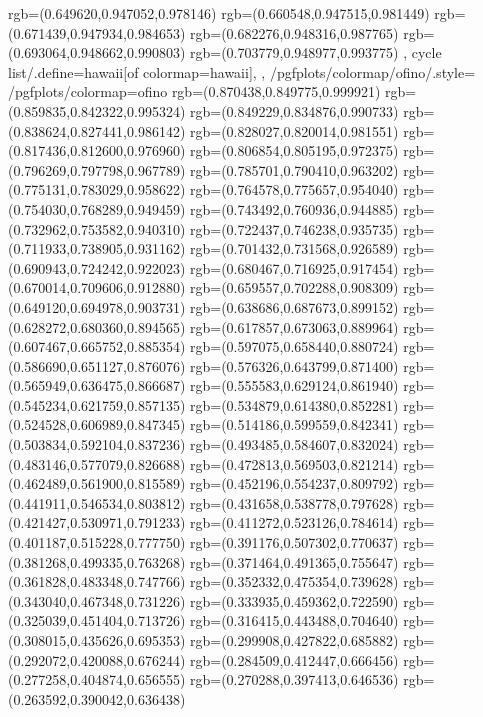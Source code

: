 {{{			rgb=(0.649620,0.947052,0.978146)
			rgb=(0.660548,0.947515,0.981449)
			rgb=(0.671439,0.947934,0.984653)
			rgb=(0.682276,0.948316,0.987765)
			rgb=(0.693064,0.948662,0.990803)
			rgb=(0.703779,0.948977,0.993775)
		},
	cycle list/.define={hawaii}{[of colormap=hawaii]},
	},
	/pgfplots/colormap/ofino/.style={
		/pgfplots/colormap={ofino}{%
			rgb=(0.870438,0.849775,0.999921)
			rgb=(0.859835,0.842322,0.995324)
			rgb=(0.849229,0.834876,0.990733)
			rgb=(0.838624,0.827441,0.986142)
			rgb=(0.828027,0.820014,0.981551)
			rgb=(0.817436,0.812600,0.976960)
			rgb=(0.806854,0.805195,0.972375)
			rgb=(0.796269,0.797798,0.967789)
			rgb=(0.785701,0.790410,0.963202)
			rgb=(0.775131,0.783029,0.958622)
			rgb=(0.764578,0.775657,0.954040)
			rgb=(0.754030,0.768289,0.949459)
			rgb=(0.743492,0.760936,0.944885)
			rgb=(0.732962,0.753582,0.940310)
			rgb=(0.722437,0.746238,0.935735)
			rgb=(0.711933,0.738905,0.931162)
			rgb=(0.701432,0.731568,0.926589)
			rgb=(0.690943,0.724242,0.922023)
			rgb=(0.680467,0.716925,0.917454)
			rgb=(0.670014,0.709606,0.912880)
			rgb=(0.659557,0.702288,0.908309)
			rgb=(0.649120,0.694978,0.903731)
			rgb=(0.638686,0.687673,0.899152)
			rgb=(0.628272,0.680360,0.894565)
			rgb=(0.617857,0.673063,0.889964)
			rgb=(0.607467,0.665752,0.885354)
			rgb=(0.597075,0.658440,0.880724)
			rgb=(0.586690,0.651127,0.876076)
			rgb=(0.576326,0.643799,0.871400)
			rgb=(0.565949,0.636475,0.866687)
			rgb=(0.555583,0.629124,0.861940)
			rgb=(0.545234,0.621759,0.857135)
			rgb=(0.534879,0.614380,0.852281)
			rgb=(0.524528,0.606989,0.847345)
			rgb=(0.514186,0.599559,0.842341)
			rgb=(0.503834,0.592104,0.837236)
			rgb=(0.493485,0.584607,0.832024)
			rgb=(0.483146,0.577079,0.826688)
			rgb=(0.472813,0.569503,0.821214)
			rgb=(0.462489,0.561900,0.815589)
			rgb=(0.452196,0.554237,0.809792)
			rgb=(0.441911,0.546534,0.803812)
			rgb=(0.431658,0.538778,0.797628)
			rgb=(0.421427,0.530971,0.791233)
			rgb=(0.411272,0.523126,0.784614)
			rgb=(0.401187,0.515228,0.777750)
			rgb=(0.391176,0.507302,0.770637)
			rgb=(0.381268,0.499335,0.763268)
			rgb=(0.371464,0.491365,0.755647)
			rgb=(0.361828,0.483348,0.747766)
			rgb=(0.352332,0.475354,0.739628)
			rgb=(0.343040,0.467348,0.731226)
			rgb=(0.333935,0.459362,0.722590)
			rgb=(0.325039,0.451404,0.713726)
			rgb=(0.316415,0.443488,0.704640)
			rgb=(0.308015,0.435626,0.695353)
			rgb=(0.299908,0.427822,0.685882)
			rgb=(0.292072,0.420088,0.676244)
			rgb=(0.284509,0.412447,0.666456)
			rgb=(0.277258,0.404874,0.656555)
			rgb=(0.270288,0.397413,0.646536)
			rgb=(0.263592,0.390042,0.636438)
}}}
